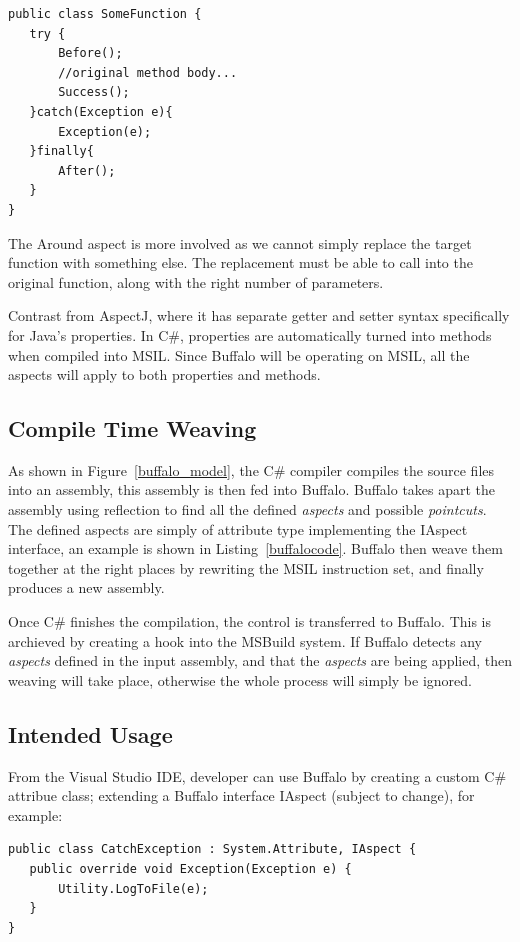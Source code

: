 \begin{lstlisting}[caption={Buffalo aspects}, label=boundaryaspect]
public class SomeFunction {
   try {
       Before();
       //original method body...
       Success();
   }catch(Exception e){
       Exception(e);
   }finally{
       After();
   }
}
\end{lstlisting}

The Around aspect is more involved as we cannot simply replace the target function with something else. The replacement must be able to call into the original function, along with the right number of parameters.

Contrast from AspectJ, where it has separate getter and setter syntax specifically for Java's properties. In C\#, properties are automatically turned into methods when compiled into MSIL. Since Buffalo will be operating on MSIL, all the aspects will apply to both properties and methods.

\subsection{Compile Time Weaving}
As shown in Figure~\ref{buffalo_model}, the C\# compiler compiles the source files into an assembly, this assembly is then fed into Buffalo. Buffalo takes apart the assembly using reflection to find all the defined {\em aspects} and possible {\em pointcuts}. The defined aspects are simply of attribute type implementing the IAspect interface, an example is shown in Listing~\ref{buffalocode}. Buffalo then weave them together at the right places by rewriting the MSIL instruction set, and finally produces a new assembly.

Once C\# finishes the compilation, the control is transferred to Buffalo. This is archieved by creating a hook into the MSBuild system. If Buffalo detects any {\em aspects} defined in the input assembly, and that the {\em aspects} are being applied, then weaving will take place, otherwise the whole process will simply be ignored.

\subsection{Intended Usage}
From the Visual Studio IDE, developer can use Buffalo by creating a custom C\# attribue class; extending a Buffalo interface IAspect (subject to change), for example:

\begin{lstlisting}[caption={Buffalo aspect}, label=buffalocode]
public class CatchException : System.Attribute, IAspect {
   public override void Exception(Exception e) {
       Utility.LogToFile(e);
   } 
}
\end{lstlisting}


